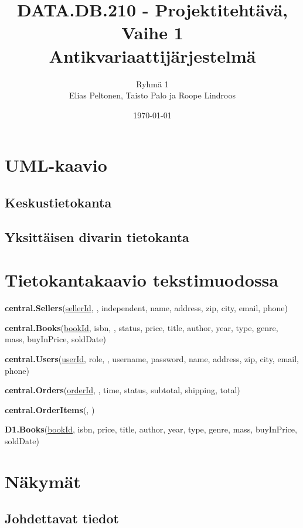 \documentclass[11pt,a4paper]{article}
\title{DATA.DB.210 - Projektitehtävä, Vaihe 1 \\ \large Antikvariaattijärjestelmä}
\author{Ryhmä 1 \\ \small Elias Peltonen, Taisto Palo ja Roope Lindroos}
\date{\today}
\begin{document}
\maketitle
\newpage

\tableofcontents
\newpage

\section{UML-kaavio}

\subsection{Keskustietokanta}



\subsection{Yksittäisen divarin tietokanta}



\section{Tietokantakaavio tekstimuodossa}

\small{
	\textbf{central.Sellers}(\underline{sellerId}, , independent, name, address, zip, city, email, phone)
	
	\textbf{central.Books}(\underline{bookId}, isbn, , status, price, title, author, year, type, genre, mass, buyInPrice, soldDate)
	
	\textbf{central.Users}(\underline{userId}, role, , username, password, name, address, zip, city, email, phone)
	
	\textbf{central.Orders}(\underline{orderId}, , time, status, subtotal, shipping, total)
	
	\textbf{central.OrderItems}(, )
	
	\textbf{D1.Books}(\underline{bookId}, isbn, price, title, author, year, type, genre, mass, buyInPrice, soldDate)
}


\section{Näkymät}

\subsection{Johdettavat tiedot}
\end{document}
